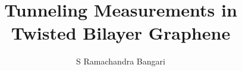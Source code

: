 \author{S Ramachandra Bangari}

\title{\bfseries Tunneling Measurements in Twisted Bilayer Graphene}

